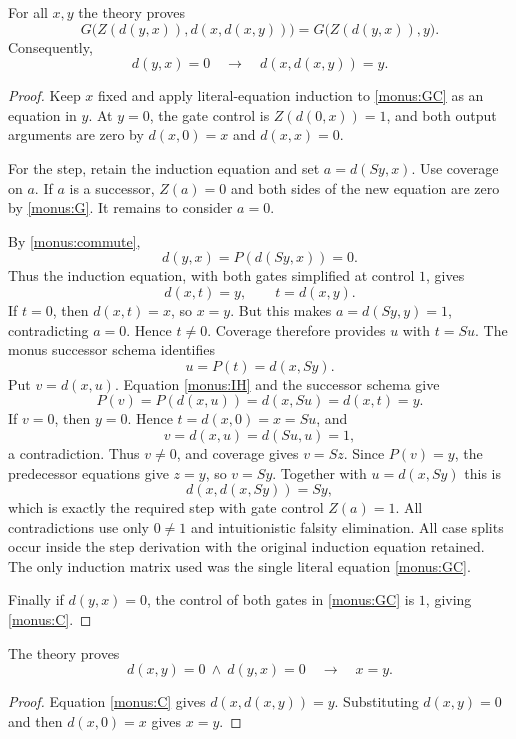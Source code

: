 \begin{lemma}\label{monus:complement}
For all $x,y$ the theory proves
\[
 G\bigl(Z(d(y,x)),d(x,d(x,y))\bigr)
       =G\bigl(Z(d(y,x)),y\bigr).
 \tag{GC}\label{monus:GC}
\]
Consequently,
\[
 d(y,x)=0\quad\longrightarrow\quad d(x,d(x,y))=y.
 \tag{C}\label{monus:C}
\]
\end{lemma}
\begin{proof}
Keep $x$ fixed and apply literal-equation induction to
\eqref{monus:GC} as an equation in $y$. At $y=0$, the gate control
is $Z(d(0,x))=1$, and both output arguments are zero by
$d(x,0)=x$ and $d(x,x)=0$.

For the step, retain the induction equation and set
$a=d(Sy,x)$. Use coverage on $a$. If $a$ is a successor, $Z(a)=0$
and both sides of the new equation are zero by \eqref{monus:G}.
It remains to consider $a=0$.

By \eqref{monus:commute},
\[
 d(y,x)=P(d(Sy,x))=0.
\]
Thus the induction equation, with both gates simplified at control $1$,
gives
\[
 d(x,t)=y,\qquad t=d(x,y).
 \tag{IH}\label{monus:IH}
\]
If $t=0$, then $d(x,t)=x$, so $x=y$. But this makes
$a=d(Sy,y)=1$, contradicting $a=0$. Hence $t\ne0$.
Coverage therefore provides $u$ with $t=Su$. The monus successor
schema identifies
\[
 u=P(t)=d(x,Sy).
\]
Put $v=d(x,u)$. Equation \eqref{monus:IH} and the successor schema give
\[
 P(v)=P(d(x,u))=d(x,Su)=d(x,t)=y.
\]
If $v=0$, then $y=0$. Hence $t=d(x,0)=x=Su$, and
\[
 v=d(x,u)=d(Su,u)=1,
\]
a contradiction. Thus $v\ne0$, and coverage gives $v=Sz$.
Since $P(v)=y$, the predecessor equations give $z=y$, so $v=Sy$.
Together with $u=d(x,Sy)$ this is
\[
 d(x,d(x,Sy))=Sy,
\]
which is exactly the required step with gate control $Z(a)=1$.
All contradictions use only $0\ne1$ and intuitionistic falsity elimination.
All case splits occur inside the step derivation with the original
induction equation retained. The only induction matrix used was the
single literal equation \eqref{monus:GC}.

Finally if $d(y,x)=0$, the control of both gates in
\eqref{monus:GC} is $1$, giving \eqref{monus:C}.
\end{proof}

\begin{corollary}\label{monus:antisymmetry}
The theory proves
\[
 d(x,y)=0\ \wedge\ d(y,x)=0\quad\longrightarrow\quad x=y.
\]
\end{corollary}
\begin{proof}
Equation \eqref{monus:C} gives $d(x,d(x,y))=y$. Substituting
$d(x,y)=0$ and then $d(x,0)=x$ gives $x=y$.
\end{proof}


